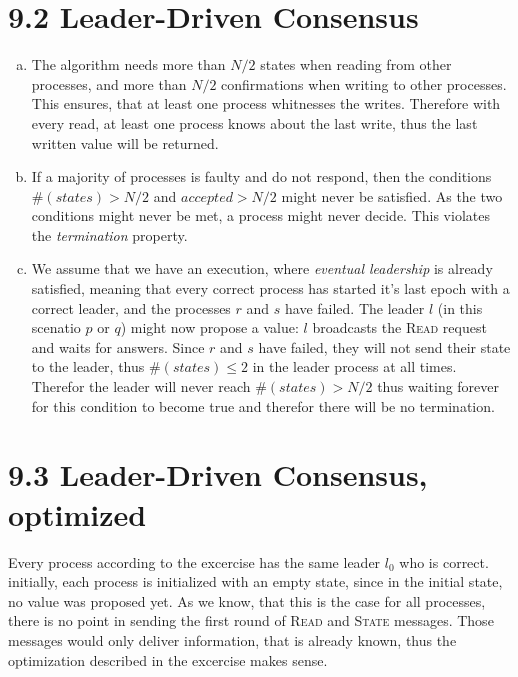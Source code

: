 \documentclass{article}
\begin{document}
    \section*{9.2 Leader-Driven Consensus}
    \begin{enumerate}[a)]
        \item The algorithm needs more than $N/2$ states when reading from other processes, and more than $N/2$ confirmations when writing to other processes.
        This ensures, that at least one process whitnesses the writes.
        Therefore with every read, at least one process knows about the last write, thus the last written value will be returned.
        \item If a majority of processes is faulty and do not respond, then the conditions $\#(states) > N/2$ and $accepted > N/2$ might never be satisfied. 
        As the two conditions might never be met, a process might never decide. This violates the \textit{termination} property.
        \item We assume that we have an execution, where \textit{eventual leadership} is already satisfied, meaning that every correct process has started it's last epoch with a correct leader, and the processes $r$ and $s$ have failed.
        The leader $l$ (in this scenatio $p$ or $q$) might now propose a value: $l$ broadcasts the \textsc{Read} request and waits for answers.
        Since $r$ and $s$ have failed, they will not send their state to the leader, thus $\#(states) \leq 2$ in the leader process at all times.
        Therefor the leader will never reach $\#(states) > N/2$ thus waiting forever for this condition to become true and therefor there will be no termination.
    \end{enumerate}

    \section*{9.3 Leader-Driven Consensus, optimized}
    Every process according to the excercise has the same leader $l_0$ who is correct. 
    initially, each process is initialized with an empty state, since in the initial state, no value was proposed yet.
    As we know, that this is the case for all processes, there is no point in sending the first round of \textsc{Read} and \textsc{State} messages.
    Those messages would only deliver information, that is already known, thus the optimization described in the excercise makes sense.
    
    
\end{document}

